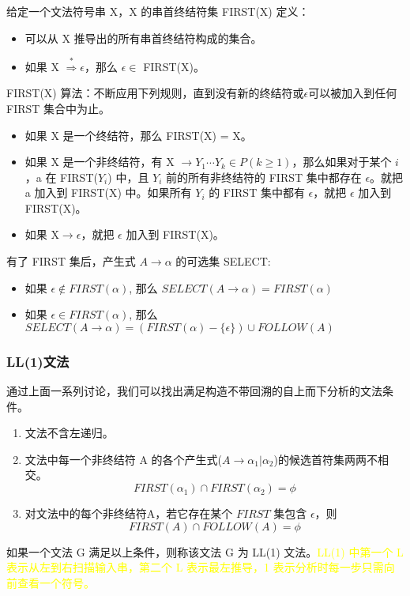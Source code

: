 给定一个文法符号串 X，X 的串首终结符集 FIRST(X) 定义：
\begin{itemize}
    \item 可以从 X 推导出的所有串首终结符构成的集合。
    \item 如果 X $\stackrel{*}{\Rightarrow} \epsilon$，那么 $\epsilon \in$ FIRST(X)。
\end{itemize}

FIRST(X) 算法：不断应用下列规则，直到没有新的终结符或$\epsilon$可以被加入到任何 FIRST 集合中为止。
\begin{itemize}
    \item 如果 X 是一个终结符，那么 FIRST(X) = X。
    \item 如果 X 是一个非终结符，有 X $\rightarrow Y_1 \cdots Y_k \in P (k\geq 1) $，那么如果对于某个 $i$，a 在 FIRST($Y_i$) 中，且 $Y_i$ 前的所有非终结符的 FIRST 集中都存在 $\epsilon$。就把 a 加入到 FIRST(X) 中。如果所有 $Y_i$ 的 FIRST 集中都有 $\epsilon$，就把 $\epsilon$ 加入到 FIRST(X)。
    \item 如果 X$\rightarrow \epsilon$，就把 $\epsilon$ 加入到 FIRST(X)。
\end{itemize}

有了 FIRST 集后，产生式 $A \rightarrow \alpha$ 的可选集 SELECT:
\begin{itemize}
    \item 如果 $\epsilon \notin FIRST(\alpha)$, 那么 $SELECT(A\rightarrow\alpha) = FIRST(\alpha)$
    \item 如果 $\epsilon \in FIRST(\alpha)$, 那么 $SELECT(A\rightarrow\alpha) = (FIRST(\alpha) - \{\epsilon\}) \cup FOLLOW(A)$
\end{itemize}

\newpage

\subsubsection{\textcolor{imp}{LL(1)文法}}

通过上面一系列讨论，我们可以找出满足构造不带回溯的自上而下分析的文法条件。
\textcolor{imp}{
    \begin{enumerate}
        \item 文法不含左递归。
        \item 文法中每一个非终结符 A 的各个产生式($A\rightarrow \alpha_1 | \alpha_2$)的候选首符集两两不相交。
              \[FIRST(\alpha_1) \cap FIRST(\alpha_2) = \phi \]
        \item 对文法中的每个非终结符A，若它存在某个 $FIRST$ 集包含 $\epsilon$，则
              \[ FIRST(A) \cap FOLLOW(A) = \phi \]
    \end{enumerate}}
如果一个文法 G 满足以上条件，则称该文法 G 为 LL(1) 文法。\textcolor{mark}{LL(1) 中第一个 L 表示从左到右扫描输入串，第二个 L 表示最左推导，1 表示分析时每一步只需向前查看一个符号。}

